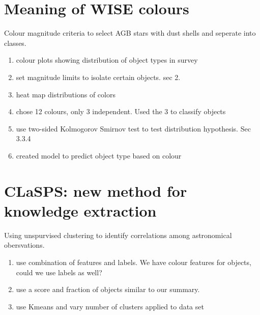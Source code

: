 \documentclass{article}
\begin{document}
\section{Meaning of WISE colours} 
Colour magnitude criteria to select AGB stars with dust shells and seperate into classes. 
\begin{enumerate} 
\item colour plots showing distribution of object types in survey 
\item set magnitude limits to isolate certain objects. sec 2. 
\item heat map distributions of colors 
\item chose 12 colours, only 3 independent. Used the 3 to classify objects
\item use two-sided Kolmogorov Smirnov test to test distribution hypothesis. Sec 3.3.4
\item created model to predict object type based on colour
\end{enumerate} 

\section{CLaSPS: new method for knowledge extraction} 
Using unspurvised clustering to identify correlations among astronomical obersvations. 
\begin{enumerate} 
\item use combination of features and labels. We have colour features for objects, could we use labels as well? 
\item use a score and fraction of objects similar to our summary. 
\item use Kmeans and vary number of clusters applied to data set
\end{enumerate}
\end{document}
